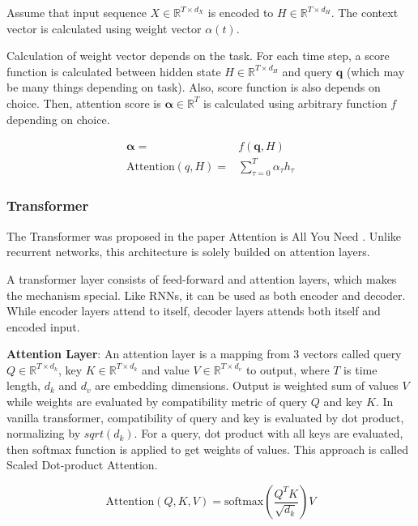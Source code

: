 Assume that input sequence $X \in \mathbb{R}^{T \times d_X}$ is encoded to $H \in \mathbb{R}^{T \times d_H}$. The context vector is calculated using weight vector $\alpha(t)$. 

Calculation of weight vector depends on the task. For each time step, a score function is calculated between hidden state $H \in \mathbb{R}^{T \times d_H}$ and query $\boldsymbol{q}$ (which may be many things depending on task). Also, score function is also depends on choice. Then, attention score is $\boldsymbol{\alpha} \in \mathbb{R}^{T}$ is calculated using arbitrary function $f$ depending on choice.

\begin{equation}
\begin{split}
\boldsymbol{\alpha} = & f(\boldsymbol{q}, H) \\
\mathrm{Attention}(q, H) = & \sum_{\tau=0}^{T} \alpha_{\tau} h_{\tau}
\end{split}
\end{equation}


\subsubsection{Transformer}
The Transformer was proposed in the paper Attention is All You Need \cite{vaswani_attention_2017} . Unlike recurrent networks, this architecture is solely builded on attention layers. 

A transformer layer consists of feed-forward and attention layers, which makes the mechanism special. Like RNNs, it can be used as both encoder and decoder. While encoder layers attend to itself, decoder layers attends both itself and encoded input.

\textbf{Attention Layer}: An attention layer is a mapping from 3 vectors called query $Q \in \mathbb{R}^{T \times d_k}$, key $K \in \mathbb{R}^{T \times d_k}$ and value $V \in \mathbb{R}^{T \times d_v}$ to output, where $T$ is time length, $d_k$ and $d_v$ are embedding dimensions. Output is weighted sum of values $V$ while weights are evaluated by compatibility metric of query $Q$ and key $K$. In vanilla transformer, compatibility of query and key is evaluated by dot product, normalizing by $sqrt(d_k)$. For a query, dot product with all keys are evaluated, then softmax function is applied to get weights of values. This approach is called Scaled Dot-product Attention.

\begin{equation}
\mathrm{Attention}(Q, K, V) = \mathrm{softmax}(\frac{Q^{T} K}{\sqrt{d_k}}) V
\end{equation}

